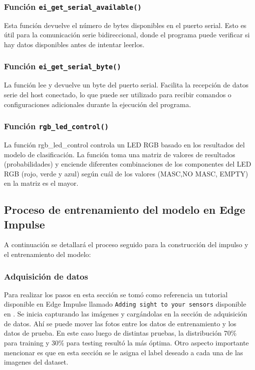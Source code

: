\subsubsection{Función \texttt{ei\_get\_serial\_available()}}
Esta función devuelve el número de bytes disponibles en el puerto serial. Esto es útil para la comunicación serie bidireccional, donde el programa puede verificar si hay datos disponibles antes de intentar leerlos.

\subsubsection{Función \texttt{ei\_get\_serial\_byte()}}
La función lee y devuelve un byte del puerto serial. Facilita la recepción de datos serie del host conectado, lo que puede ser utilizado para recibir comandos o configuraciones adicionales durante la ejecución del programa.

\subsubsection{Función \texttt{rgb\_led\_control()}}
La función rgb\_led\_control controla un LED RGB basado en los resultados del modelo de clasificación. La función toma una matriz de valores de resultados (probabilidades) y enciende diferentes combinaciones de los componentes del LED RGB (rojo, verde y azul) según cuál de los valores (MASC,NO MASC, EMPTY) en la matriz es el mayor.

\subsection{Proceso de entrenamiento del modelo en Edge Impulse}
A continuación se detallará el proceso seguido para la construcción del impulso y el entrenamiento del modelo: 

\subsubsection{Adquisición de datos}
Para realizar los pasos en esta sección se tomó como referencia un tutorial disponible en Edge Impulse llamado \texttt{Adding sight to your sensors} disponible en \cite{Adding_sight_to_your_sensors}.
Se inicia capturando las imágenes y cargándolas en la sección de adquisición de datos. Ahí se puede mover las fotos entre los datos de entrenamiento y los datos de prueba. En este caso luego de distintas pruebas, la distribución 70\% para training y 30\% para testing resultó la más óptima. Otro aspecto importante mencionar es que en esta sección se le asigna el label deseado a cada una de las imagenes del dataset.

